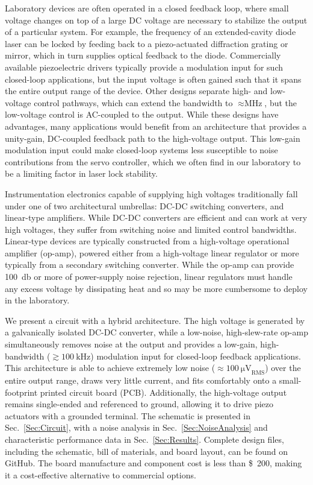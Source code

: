 \documentclass[aip,rsi,reprint]{revtex4-1} %
\begin{document}
Laboratory devices are often operated in a closed feedback loop, where small voltage changes on top of a large DC voltage are necessary to stabilize the output of a particular system.
For example, the frequency of an extended-cavity diode laser can be locked by feeding back to a piezo-actuated diffraction grating or mirror, which in turn supplies optical feedback to the diode.
Commercially available piezoelectric drivers typically provide a modulation input for such closed-loop applications, but the input voltage is often gained such that it spans the entire output range of the device.
Other designs separate high- and low-voltage control pathways, which can extend the bandwidth to $\approx\si{\mega\hertz}$, but the low-voltage control is AC-coupled to the output.\cite{Fleming2009a}
While these designs have advantages, many applications would benefit from an architecture that provides a unity-gain, DC-coupled feedback path to the high-voltage output.
This low-gain modulation input could make closed-loop systems less susceptible to noise contributions from the servo controller, which we often find in our laboratory to be a limiting factor in laser lock stability.

Instrumentation electronics capable of supplying high voltages traditionally fall under one of two architectural umbrellas: DC-DC switching converters, and linear-type amplifiers.
While DC-DC converters are efficient and can work at very high voltages, they suffer from switching noise and limited control bandwidths.
Linear-type devices are typically constructed from a high-voltage operational amplifier (op-amp), powered either from a high-voltage linear regulator or more typically from a secondary switching converter.
While the op-amp can provide \SI{100}{\decibel} or more of power-supply noise rejection\cite{PA84Datasheet}, linear regulators must handle any excess voltage by dissipating heat and so may be more cumbersome to deploy in the laboratory.

We present a circuit with a hybrid architecture.
The high voltage is generated by a galvanically isolated DC-DC converter, while a low-noise, high-slew-rate op-amp simultaneously removes noise at the output and provides a low-gain, high-bandwidth ($\gtrsim \SI{100}{\kilo\hertz}$) modulation input for closed-loop feedback applications.
This architecture is able to achieve extremely low noise ($\approx\SI{100}{\micro\volt}_{\text{RMS}}$) over the entire output range, draws very little current, and fits comfortably onto a small-footprint printed circuit board (PCB).
Additionally, the high-voltage output remains single-ended and referenced to ground, allowing it to drive piezo actuators with a grounded terminal.
The schematic is presented in Sec.~\ref{Sec:Circuit}, with a noise analysis in Sec.~\ref{Sec:NoiseAnalysis} and characteristic performance data in Sec.~\ref{Sec:Results}.
Complete design files, including the schematic, bill of materials, and board layout, can be found on GitHub.\cite{PiezoDesignFiles}
The board manufacture and component cost is less than \SI{200}[\$]{}, making it a cost-effective alternative to commercial options. 
\end{document}
